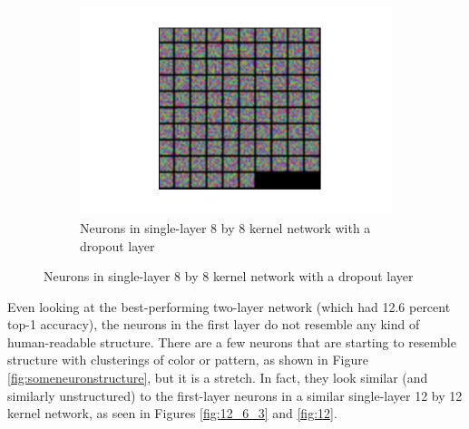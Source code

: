 \documentclass[10pt]{article}
\begin{document}
\begin{figure}[!ht]
\begin{subfigure}[t]{0.32\textwidth}
	\includegraphics[width=\textwidth]{8_kernel_1_pool_1_dropout_5000_step_5000_after_20000.pdf}
	\caption{Neurons in single-layer 8 by 8 kernel network with a dropout layer}
	\label{fig:8dropoff}
\end{subfigure}
\end{figure}

Even looking at the best-performing two-layer network (which had 12.6 percent top-1 accuracy), the neurons in the first layer do not resemble any kind of human-readable structure. There are a few neurons that are starting to resemble structure with clusterings of color or pattern, as shown in Figure \ref{fig:someneuronstructure}, but it is a stretch. In fact, they look similar (and similarly unstructured) to the first-layer neurons in a similar single-layer 12 by 12 kernel network, as seen in Figures \ref{fig:12_6_3} and \ref{fig:12}.
\end{document}
